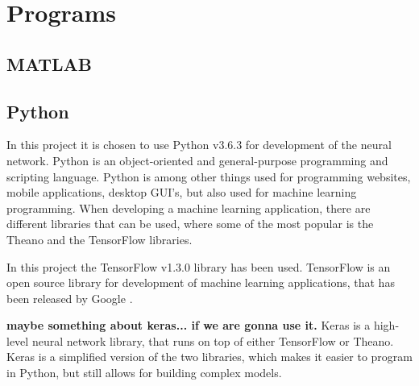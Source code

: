 \section{Programs}


\subsection{MATLAB}


\subsection{Python}
In this project it is chosen to use Python v3.6.3 for development of the neural network.  
Python is an object-oriented and general-purpose programming and scripting language. Python is among other things used for programming websites, mobile applications, desktop GUI's, but also used for machine learning programming.
When developing a machine learning application, there are different libraries that can be used, where some of the most popular is the Theano and the TensorFlow libraries.\citep{Swamynathan2017}

In this project the TensorFlow v1.3.0 library has been used. 
TensorFlow is an open source library for development of machine learning applications, that has been released by Google \citep{Swamynathan2017}. 


\textbf{maybe something about keras... if we are gonna use it.  }
Keras is a high-level neural network library, that runs on top of either TensorFlow or Theano. Keras is a simplified version of the two libraries, which makes it easier to program in Python, but still allows for building complex models.\citep{Swamynathan2017}  